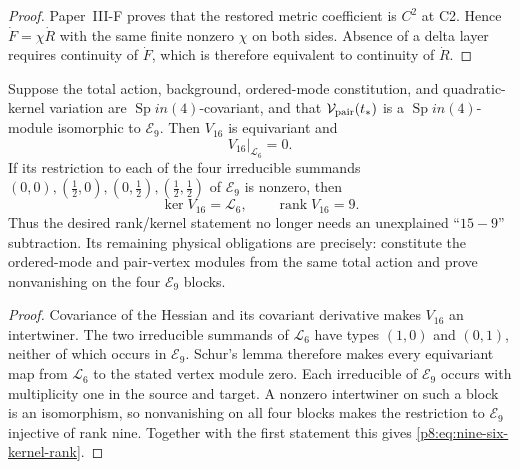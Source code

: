 \documentclass[12pt,a4paper]{article}
\begin{document}
\begin{proof}
Paper~III-F proves that the restored metric coefficient is $C^2$ at C2.
Hence $\dot F=\chi\dot R$ with the same finite nonzero $\chi$ on both sides.
Absence of a delta layer requires continuity of $\dot F$, which is therefore
equivalent to continuity of $\dot R$.
\end{proof}

\begin{theorem}
\label{p8:thm:nine-six-representation-reduction}
Suppose the total action, background, ordered-mode constitution, and
quadratic-kernel variation are \(\operatorname{Sp}in(4)\)-covariant, and that
\(\mathcal V_{\rm pair}(t_*)\) is a \(\operatorname{Sp}in(4)\)-module isomorphic to
\(\mathcal E_9\).  Then \(V_{16}\) is equivariant and
\begin{equation}
 \label{p8:eq:equivariance-kills-six}
 \boxed{V_{16}|_{\mathcal L_6}=0.}
\end{equation}
If its restriction to each of the four
irreducible summands
\((0,0),(\tfrac12,0),(0,\tfrac12),(\tfrac12,\tfrac12)\) of
\(\mathcal E_9\) is nonzero, then
\begin{equation}
 \label{p8:eq:nine-six-kernel-rank}
 \boxed{\ker V_{16}=\mathcal L_6,
 \qquad\operatorname{rank}V_{16}=9.}
\end{equation}
Thus the desired rank/kernel statement no longer needs an unexplained
``\(15-9\)'' subtraction.  Its remaining physical obligations are precisely:
constitute the ordered-mode and pair-vertex modules from the same total
action and prove nonvanishing on the four \(\mathcal E_9\) blocks.
\end{theorem}

\begin{proof}
Covariance of the Hessian and its covariant derivative makes \(V_{16}\) an
intertwiner.
The two irreducible summands of \(\mathcal L_6\) have types \((1,0)\) and
\((0,1)\), neither of which occurs in \(\mathcal E_9\).  Schur's lemma
therefore makes every equivariant map from \(\mathcal L_6\) to the stated
vertex module zero.  Each irreducible of \(\mathcal E_9\) occurs with multiplicity
one in the source and target.  A nonzero intertwiner on such a block is an
isomorphism, so nonvanishing on all four blocks makes the restriction to
\(\mathcal E_9\) injective of rank nine.  Together with the first statement
this gives \eqref{p8:eq:nine-six-kernel-rank}.
\end{proof}
\end{document}
